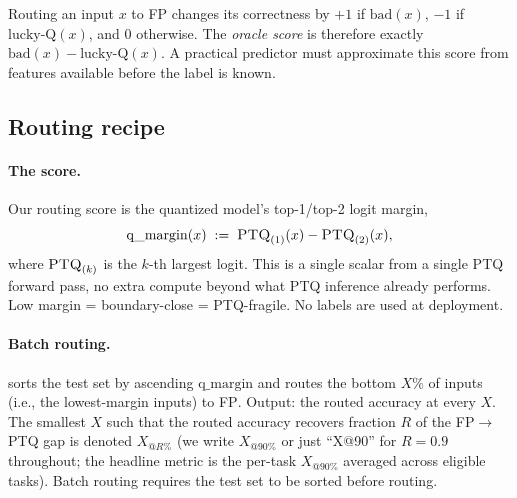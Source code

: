 \documentclass{article}
\makeatletter
\newcommand{\fp}{\textsc{FP}\xspace}
\newcommand{\ptq}{\textsc{PTQ}\xspace}
\newcommand{\xat}[1]{\ensuremath{X_{@#1\%}}}
\makeatother
\begin{document}
Routing an input \(x\) to \fp{} changes its correctness by \(+1\) if \(\text{bad}(x)\), \(-1\) if \(\text{lucky-Q}(x)\), and 0 otherwise.
The \emph{oracle score} is therefore exactly \(\text{bad}(x)-\text{lucky-Q}(x)\).
A practical predictor must approximate this score from features available before the label is known.

\subsection{Routing recipe}\label{sec:routing_recipe}

\paragraph{The score.}
Our routing score is the quantized model's top-1/top-2 logit margin,
\[
  \mathrm{q\_margin}(x) \;:=\; \ptq_{(1)}(x) - \ptq_{(2)}(x),
\]
where $\ptq_{(k)}$ is the $k$-th largest logit. This is a single scalar from a single \ptq{} forward pass, no extra compute beyond what \ptq{} inference already performs. Low margin = boundary-close = PTQ-fragile. No labels are used at deployment.

\paragraph{Batch routing.} sorts the test set by ascending $\mathrm{q\_margin}$ and routes the bottom $X\%$ of inputs (i.e., the lowest-margin inputs) to \fp{}. Output: the routed accuracy at every $X$. The smallest $X$ such that the routed accuracy recovers fraction $R$ of the \fp$\to$\ptq{} gap is denoted \xat{R} (we write \xat{90} or just ``X@90'' for $R\!=\!0.9$ throughout; the headline metric is the per-task \xat{90} averaged across eligible tasks). Batch routing requires the test set to be sorted before routing.
\end{document}
